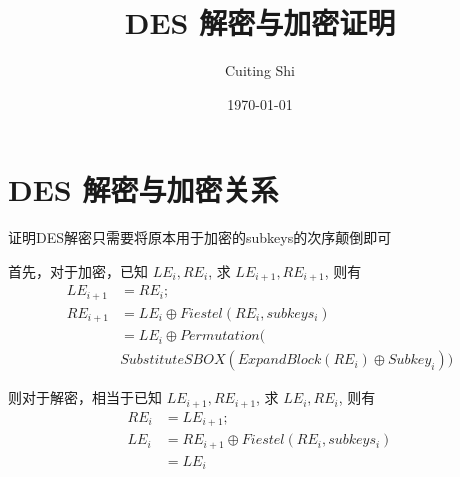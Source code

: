 \documentclass[a4paper]{ctexart}
\title{DES 解密与加密证明}
\author{Cuiting Shi}
\date{\today{}}
\begin{document}
\maketitle{}

\section{DES 解密与加密关系}

证明DES解密只需要将原本用于加密的subkeys的次序颠倒即可

首先，对于加密，已知 $ LE_i, RE_i $, 求 $ LE_{i+1}, RE_{i+1} $, 则有
\begin{equation}
  \begin{split}
  LE_{i+1} & =  RE_i; \\
  RE_{i+1} & =  LE_i \oplus Fiestel(RE_i, subkeys_i) \\
           & =  LE_i \oplus Permutation( \\
           &   SubstituteSBOX(ExpandBlock(RE_i) \oplus Subkey_i) )
  \end{split}
  \label{equ_encrypt}
\end{equation}


则对于解密，相当于已知 $ LE_{i+1}, RE_{i+1} $, 求 $ LE_i, RE_i $, 则有
\begin{equation}
  \begin{split}
  RE_i & = LE_{i+1}; \\
  LE_i & = RE_{i+1} \oplus Fiestel(RE_i, subkeys_i) \\
       & = LE_i
  \end{split}
  \label{equ_decrypt}
\end{equation}
\end{document}
